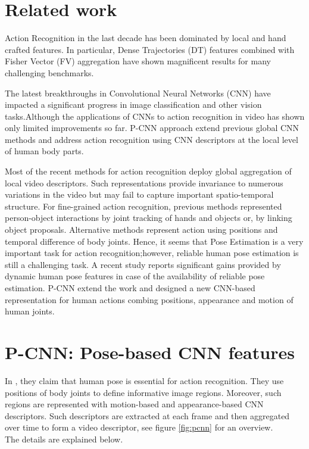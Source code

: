\documentclass[10pt,twocolumn,letterpaper]{article}
\begin{document}
\section{Related work}
\label{related-work}
Action Recognition in the last decade has been dominated by local and hand crafted features. In particular, Dense Trajectories (DT) features\cite{wang2013action} combined with Fisher Vector (FV)\cite{perronnin2010improving} aggregation have shown magnificent results for many challenging benchmarks.

The latest breakthroughs in Convolutional Neural Networks (CNN) have impacted a significant progress in image classification and other vision tasks.Although the applications of CNNs to action recognition in video\cite{simonyan2014two,yue2015beyond} has shown only limited improvements so far. P-CNN approach extend previous global CNN methods and address action recognition using CNN descriptors at the local level of human body parts.

Most of the recent methods for action recognition deploy global aggregation of local video descriptors. Such representations provide invariance to numerous variations
in the video but may fail to capture important spatio-temporal structure. For fine-grained action recognition, previous methods represented person-object interactions by joint tracking of hands and objects\cite{ni2014multiple} or, by linking
object proposals\cite{zhou2015interaction}. Alternative methods represent action using positions and temporal difference of body joints. Hence, it seems that Pose Estimation is a very important task for action recognition;however, reliable human pose estimation is still a challenging task. A recent study \cite{jhuang2013towards} reports significant gains provided by dynamic human pose features in case of the availability of reliable pose estimation. P-CNN extend the work \cite{jhuang2013towards} and designed a new CNN-based representation for human actions combing positions, appearance and motion of human joints.

\section{P-CNN: Pose-based CNN features}
\label{pcnn-features}

In \cite{cheron2015p}, they claim that human pose is essential for action recognition. They use positions of body joints to define informative image regions. Moreover, such regions are represented with motion-based and appearance-based CNN descriptors. Such descriptors
are extracted at each frame and then aggregated over time
to form a video descriptor, see figure \ref{fig:pcnn} for an overview.\\
The details are explained below.
\end{document}
